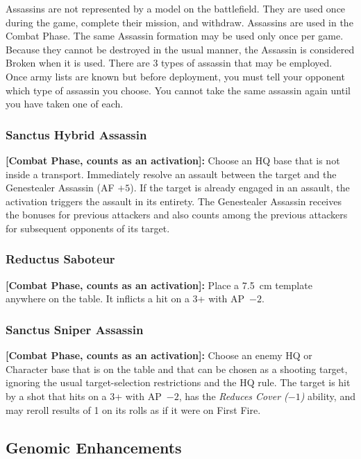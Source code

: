 Assassins are not represented by a model on the battlefield. They are used once during the game, complete their mission, and withdraw. Assassins are used in the Combat Phase. The same Assassin formation may be used only once per game. Because they cannot be destroyed in the usual manner, the Assassin is considered Broken when it is used. There are 3 types of assassin that may be employed. Once army lists are known but before deployment, you must tell your opponent which type of assassin you choose. You cannot take the same assassin again until you have taken one of each.

\subsubsection{Sanctus Hybrid Assassin}

\textbf{[Combat Phase, counts as an activation]:} Choose an HQ base that is not inside a transport. Immediately resolve an assault between the target and the Genestealer Assassin (AF $+5$). If the target is already engaged in an assault, the activation triggers the assault in its entirety. The Genestealer Assassin receives the bonuses for previous attackers and also counts among the previous attackers for subsequent opponents of its target.

\subsubsection{Reductus Saboteur}

\textbf{[Combat Phase, counts as an activation]:} Place a 7.5~cm template anywhere on the table. It inflicts a hit on a 3+ with AP~$-2$.

\subsubsection{Sanctus Sniper Assassin}

\textbf{[Combat Phase, counts as an activation]:} Choose an enemy HQ or Character base that is on the table and that can be chosen as a shooting target, ignoring the usual target-selection restrictions and the HQ rule. The target is hit by a shot that hits on a 3+ with AP~$-2$, has the \textit{Reduces Cover ($-1$)} ability, and may reroll results of 1 on its rolls as if it were on First Fire.

\subsection{Genomic Enhancements}


